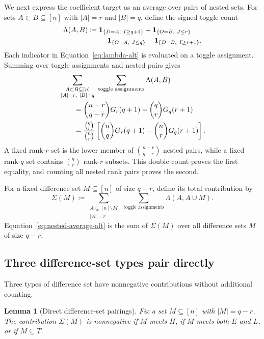 \documentclass[11pt]{article}
\newtheorem{lemma}[theorem]{Lemma}
\newcommand{\one}{\ensuremath{\mathbf 1}\xspace}
\begin{document}
We next express the coefficient target as an average over pairs of nested sets.
For sets $A\subset B\subseteq[n]$ with ${|A|=r}$ and ${|B|=q}$, define the signed toggle count
\begin{align}
\Lambda(A,B)
\coloneqq{}&
\one_{\{D=A,\ I\geq q+1\}}
+\one_{\{O=B,\ J\leq r\}}\notag\\
&-\one_{\{O=A,\ J\leq q\}}
-\one_{\{D=B,\ I\geq r+1\}}.
\label{eq:lambda-alt}
\end{align}
Each indicator in Equation~\eqref{eq:lambda-alt} is evaluated on a toggle assignment.
Summing over toggle assignments and nested pairs gives
\begin{align}
&\sum_{\substack{A\subset B\subseteq[n]\\|A|=r,\ |B|=q}}
\ \sum_{\text{toggle assignments}}\Lambda(A,B)\notag\\
&\qquad=
\binom{n-r}{q-r}G_r(q+1)-\binom qrG_q(r+1)\notag\\
&\qquad=
\frac{\binom qr}{\binom nr}
\left[\binom nqG_r(q+1)-\binom nrG_q(r+1)\right].
\label{eq:nested-average-alt}
\end{align}
A fixed rank-$r$ set is the lower member of $\binom{n-r}{q-r}$ nested pairs, while a fixed rank-$q$ set contains $\binom qr$ rank-$r$ subsets.
This double count proves the first equality, and counting all nested rank pairs proves the second.

For a fixed difference set $M\subseteq[n]$ of size ${q-r}$, define its total contribution by
\begin{equation}
\Sigma(M)
\coloneqq
\sum_{\substack{A\subseteq[n]\setminus M\\|A|=r}}
\ \sum_{\text{toggle assignments}}
\Lambda(A,A\cup M).
\label{eq:fixed-M-contribution}
\end{equation}
Equation~\eqref{eq:nested-average-alt} is the sum of $\Sigma(M)$ over all difference sets $M$ of size ${q-r}$.

    \subsection{Three difference-set types pair directly}\label{subsec:fixed-difference-sets}

Three types of difference set have nonnegative contributions without additional counting.

\begin{lemma}[Direct difference-set pairings]\label{lem:direct-difference-pairings}
Fix a set $M\subseteq[n]$ with ${|M|=q-r}$.
The contribution $\Sigma(M)$ is nonnegative if $M$ meets $H$, if $M$ meets both $E$ and $L$, or if $M\subseteq T$.
\end{lemma}
\end{document}
